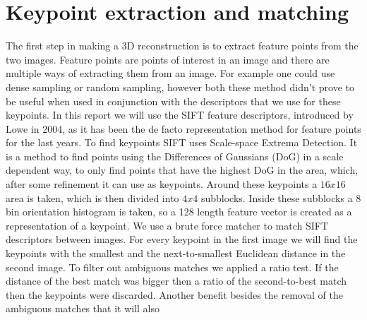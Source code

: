 \section{Keypoint extraction and matching}
\label{matching}
The first step in making a 3D reconstruction is to extract feature points from the two images.
Feature points are points of interest in an image and there are multiple ways of extracting them from an image. 
For example one could use dense sampling or random sampling, however both these method didn't prove to be useful when used in conjunction with the descriptors that we use for these keypoints.
In this report we will use the SIFT feature descriptors, introduced by Lowe\cite{SIFT} in 2004, as it has been the de facto representation method for feature points for the last years. 
To find keypoints SIFT uses Scale-space Extrema Detection. 
It is a method to find points using the Differences of Gaussians (DoG) in a scale dependent way, to only find points that have the highest DoG in the area, which, after some refinement it can use as keypoints.
Around these keypoints a $16x16$ area is taken, which is then divided into $4x4$ subblocks. 
Inside these subblocks a 8 bin orientation histogram is taken, so a 128 length feature vector is created as a representation of a keypoint.
We use a brute force matcher to match SIFT descriptors between images. 
For every keypoint in the first image we will find the keypoints with the smallest and the next-to-smallest Euclidean distance in the second image. 
To filter out ambiguous matches we applied a ratio test. If the distance of the best match was bigger then a ratio of the second-to-best match then the keypoints were discarded. Another benefit besides the removal of the ambiguous matches that it will also
